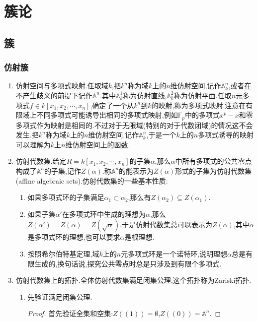 \chapter{簇论}
\section{簇}
\subsection{仿射簇}
\begin{enumerate}
	\item 仿射空间与多项式映射.任取域$k$,把$k^n$称为域$k$上的$n$维仿射空间,记作$\mathbb{A}^n_k$,或者在不产生歧义的前提下记作$\mathbb{A}^n$.其中$\mathbb{A}_k^1$称为仿射直线,$\mathbb{A}_k^2$称为仿射平面.任取$n$元多项式$f\in k[x_1,x_2,\cdots,x_n]$,确定了一个从$k^n$到$k$的映射,称为多项式映射.注意在有限域上不同多项式可能诱导出相同的多项式映射,例如$\mathbb{F}_p$中的多项式$x^p-x$和零多项式作为映射是相同的.不过对于无限域(特别的对于代数闭域)的情况这不会发生.把$k^n$称为域$k$上的$n$维仿射空间,记作$\mathbb{A}_k^n$,于是一个$k$上的$n$多项式诱导的映射可以理解为$k$上$n$维仿射空间上的函数.
	\item 仿射代数集.给定$R=k[x_1,x_2,\cdots,x_n]$的子集$\alpha$,那么$\alpha$中所有多项式的公共零点构成了$\mathbb{A}^n$的子集,记作$Z(\alpha)$.称$\mathbb{A}^n$的能表示为$Z(\alpha)$形式的子集为仿射代数集(affine algebraic sets).仿射代数集的一些基本性质:
	\begin{enumerate}
		\item 如果多项式环的子集满足$\alpha_1\subset\alpha_2$,那么有$Z(\alpha_2)\subseteq Z(\alpha_1)$.
		\item 如果子集$\alpha'$在多项式环中生成的理想为$\alpha$,那么$Z(\alpha')=Z(\alpha)=Z(\sqrt{\alpha})$.于是仿射代数集总可以表示为$Z(\alpha)$,其中$\alpha$是多项式环的理想,也可以要求$\alpha$是根理想.
		\item 按照希尔伯特基定理,域$k$上的$n$元多项式环是一个诺特环,说明理想$\alpha$总是有限生成的,换句话说,探究公共零点时总是只涉及到有限个多项式.
	\end{enumerate}
    \item 仿射代数集上的拓扑.全体仿射代数集满足闭集公理,这个拓扑称为Zariski拓扑.
    \begin{enumerate}
    	\item 先验证满足闭集公理.
    	\begin{proof}
    		
    		首先验证全集和空集:$Z((1))=\emptyset$,$Z((0))=\mathbb{A}^n$.
    		

\end{proof}
\end{enumerate}
\end{enumerate}
